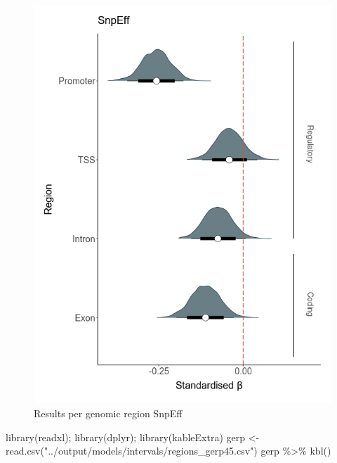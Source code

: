 \documentclass[
  letterpaper,
  DIV=11,
  numbers=noendperiod]{scrreprt}
\newenvironment{Shaded}{}{}
\newcommand{\FunctionTok}[1]{\textcolor[rgb]{0.44,0.26,0.76}{#1}}
\newcommand{\NormalTok}[1]{\textcolor[rgb]{0.14,0.16,0.18}{#1}}
\newcommand{\OtherTok}[1]{\textcolor[rgb]{0.44,0.26,0.76}{#1}}
\newcommand{\SpecialCharTok}[1]{\textcolor[rgb]{0.00,0.36,0.77}{#1}}
\newcommand{\StringTok}[1]{\textcolor[rgb]{0.01,0.18,0.38}{#1}}
\begin{document}
\begin{figure}

{\centering \includegraphics{qmd/../plots/main/fig_2d.png}

}

\caption{Results per genomic region SnpEff}

\end{figure}

\begin{Shaded}
\begin{Highlighting}[]
\FunctionTok{library}\NormalTok{(readxl); }\FunctionTok{library}\NormalTok{(dplyr); }\FunctionTok{library}\NormalTok{(kableExtra)}
\NormalTok{gerp }\OtherTok{\textless{}{-}} \FunctionTok{read.csv}\NormalTok{(}\StringTok{"../output/models/intervals/regions\_gerp45.csv"}\NormalTok{)}
\NormalTok{gerp }\SpecialCharTok{\%\textgreater{}\%} \FunctionTok{kbl}\NormalTok{() }
\end{Highlighting}
\end{Shaded}
\end{document}
